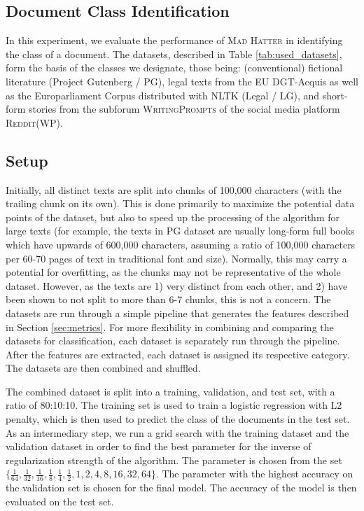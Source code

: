 \subsection{Document Class Identification}
\label{sec:document_class_identification}
In this experiment, we evaluate the performance of \textsc{Mad Hatter} in identifying the class of a document. The datasets, described in Table \ref{tab:used_datasets}, form the basis of the classes we designate, those being: (conventional) fictional literature (Project Gutenberg / PG), legal texts from the EU DGT-Acquis as well as the Europarliament Corpus distributed with NLTK (Legal / LG), and short-form stories from the subforum \textsc{WritingPrompts} of the social media platform \textsc{Reddit}(WP). 

\subsection*{Setup}
Initially, all distinct texts are split into chunks of 100,000 characters (with the trailing chunk on its own). This is done primarily to maximize the potential data points of the dataset, but also to speed up the processing of the algorithm for large texts (for example, the texts in PG dataset are usually long-form full books which have upwards of 600,000 characters, assuming a ratio of 100,000 characters per 60-70 pages of text in traditional font and size). Normally, this may carry a potential for overfitting, as the chunks may not be representative of the whole dataset. However, as the texts are 1) very distinct from each other, and 2) have been shown to not split to more than 6-7 chunks, this is not a concern. 
The datasets are run through a simple pipeline that generates the features described in Section \ref{sec:metrics}. For more flexibility in combining and comparing the datasets for classification, each dataset is separately run through the pipeline. After the features are extracted, each dataset is assigned its respective category. The datasets are then combined and shuffled.

The combined dataset is split into a training, validation, and test set, with a ratio of 80:10:10. The training set is used to train a logistic regression with L2 penalty, which is then used to predict the class of the documents in the test set. As an intermediary step, we run a grid search with the training dataset and the validation dataset in order to find the best parameter for the inverse of regularization strength of the algorithm. The parameter is chosen from the set $\{\frac{1}{64}, \frac{1}{32}, \frac{1}{16}, \frac{1}{8}, \frac{1}{4}, \frac{1}{2}, 1, 2, 4, 8 , 16, 32 , 64\}$. The parameter with the highest accuracy on the validation set is chosen for the final model. The accuracy of the model is then evaluated on the test set.

